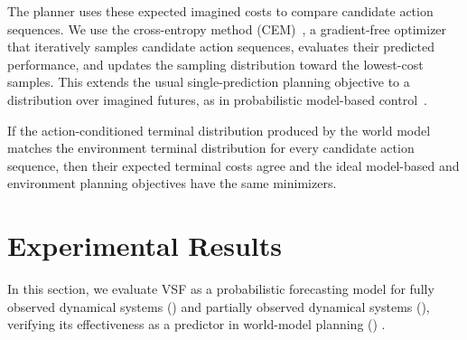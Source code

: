 \documentclass{article} %
\numberwithin{equation}{section}
\begin{document}
The planner uses these expected imagined costs to compare candidate action
sequences. We use the cross-entropy method (CEM)~\citep{rubinstein1999cross}, a gradient-free optimizer that iteratively samples candidate action sequences, evaluates their predicted performance, and updates the sampling distribution toward the lowest-cost samples. This extends the usual
single-prediction planning objective to a distribution over imagined futures,
as in probabilistic model-based control~\citep{chua2018deep}.

If the action-conditioned terminal distribution produced by the world model matches the environment terminal distribution for every candidate
action sequence, then their expected terminal costs agree and the ideal
model-based and environment planning objectives have the same minimizers. 



\section{Experimental Results}
\label{sec:results}

In this section, we evaluate VSF as a probabilistic forecasting model for fully observed dynamical systems () and partially observed dynamical systems (), verifying its effectiveness as a predictor in world-model planning () .
\end{document}
